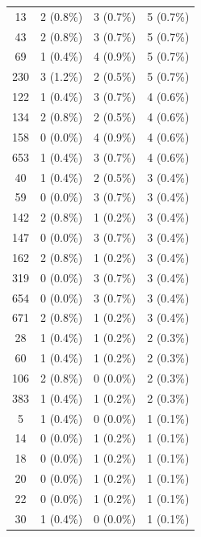 \documentclass{article}
\begin{document}
\begin{table}[hbt!]
{\begin{tabular}{cccc}
13   & 2 (0.8\%)       & 3 (0.7\%)          & 5 (0.7\%)     \\
43   & 2 (0.8\%)       & 3 (0.7\%)          & 5 (0.7\%)     \\
69   & 1 (0.4\%)       & 4 (0.9\%)          & 5 (0.7\%)     \\
230  & 3 (1.2\%)       & 2 (0.5\%)          & 5 (0.7\%)     \\
122  & 1 (0.4\%)       & 3 (0.7\%)          & 4 (0.6\%)     \\
134  & 2 (0.8\%)       & 2 (0.5\%)          & 4 (0.6\%)     \\
158  & 0 (0.0\%)       & 4 (0.9\%)          & 4 (0.6\%)     \\
653  & 1 (0.4\%)       & 3 (0.7\%)          & 4 (0.6\%)     \\
40   & 1 (0.4\%)       & 2 (0.5\%)          & 3 (0.4\%)     \\
59   & 0 (0.0\%)       & 3 (0.7\%)          & 3 (0.4\%)     \\
142  & 2 (0.8\%)       & 1 (0.2\%)          & 3 (0.4\%)     \\
147  & 0 (0.0\%)       & 3 (0.7\%)          & 3 (0.4\%)     \\
162  & 2 (0.8\%)       & 1 (0.2\%)          & 3 (0.4\%)     \\
319  & 0 (0.0\%)       & 3 (0.7\%)          & 3 (0.4\%)     \\
654  & 0 (0.0\%)       & 3 (0.7\%)          & 3 (0.4\%)     \\
671  & 2 (0.8\%)       & 1 (0.2\%)          & 3 (0.4\%)     \\
28   & 1 (0.4\%)       & 1 (0.2\%)          & 2 (0.3\%)     \\
60   & 1 (0.4\%)       & 1 (0.2\%)          & 2 (0.3\%)     \\
106  & 2 (0.8\%)       & 0 (0.0\%)          & 2 (0.3\%)     \\
383  & 1 (0.4\%)       & 1 (0.2\%)          & 2 (0.3\%)     \\
5    & 1 (0.4\%)       & 0 (0.0\%)          & 1 (0.1\%)     \\
14   & 0 (0.0\%)       & 1 (0.2\%)          & 1 (0.1\%)     \\
18   & 0 (0.0\%)       & 1 (0.2\%)          & 1 (0.1\%)     \\
20   & 0 (0.0\%)       & 1 (0.2\%)          & 1 (0.1\%)     \\
22   & 0 (0.0\%)       & 1 (0.2\%)          & 1 (0.1\%)     \\
30   & 1 (0.4\%)       & 0 (0.0\%)          & 1 (0.1\%)     \\

\end{tabular}}
\end{table}
\end{document}

